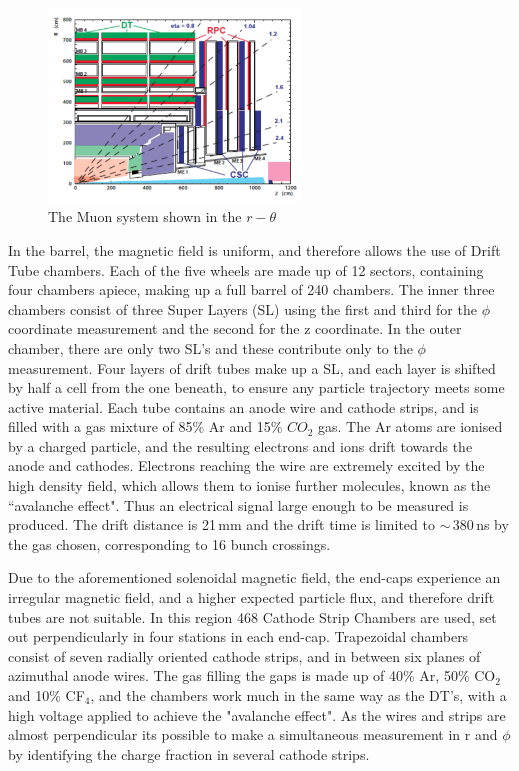 \begin{figure}
\centering
\includegraphics[width=0.6\textwidth]{Figures/Detector/MS}
\caption{The Muon system shown in the $r-\theta$}
\label{fig:MuonSystem}
\end{figure}

In the barrel, the magnetic field is uniform, and therefore allows the use of Drift Tube chambers.  Each of the five wheels are made up of 12 sectors, containing four chambers apiece, making up a full barrel of 240 chambers. The inner three chambers consist of three Super Layers (SL) using the first and third for the $\phi$ coordinate measurement and the second for the z coordinate. In the outer chamber,  there are only two SL's and these contribute only to the $\phi$ measurement. Four layers of drift tubes make up a SL, and each layer is shifted by half a cell from the one beneath, to ensure any particle trajectory meets some active material. Each tube contains an anode wire and cathode strips, and is filled with a gas mixture of 85\% Ar and 15\% $CO_{2}$ gas. The Ar atoms are ionised by a charged particle, and the resulting electrons and ions drift towards the anode and cathodes. Electrons reaching the wire are extremely excited by the high density field, which allows them to ionise further molecules, known as the ``avalanche effect". Thus an electrical signal large enough to be measured is produced. The drift distance is 21\,mm and the drift time is limited to $\sim$\,380\,ns by the gas chosen, corresponding to 16 bunch crossings.

Due to the aforementioned solenoidal magnetic field, the end-caps experience an irregular magnetic field, and a higher expected particle flux, and therefore drift tubes are not suitable. In this region 468 Cathode Strip Chambers are used, set out perpendicularly in four stations in each end-cap. Trapezoidal chambers consist of seven radially oriented cathode strips, and in between six planes of azimuthal anode wires. The gas filling the gaps is made up of 40\% Ar, 50\% CO$_{2}$ and 10\% CF$_{4}$, and the chambers work much in the same way as the DT's, with a high voltage applied to achieve the "avalanche effect". As the wires and strips are almost perpendicular its possible to make a simultaneous measurement in r and $\phi$ by identifying the charge fraction in several cathode strips. 

